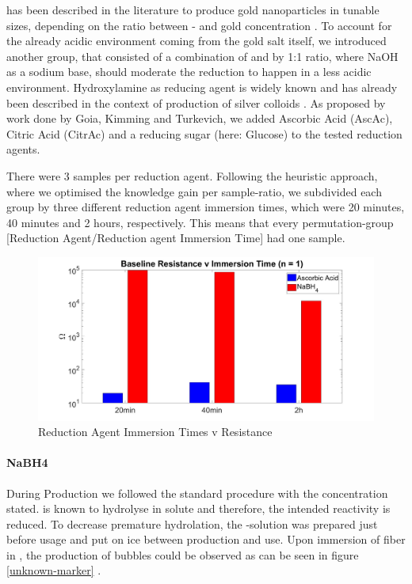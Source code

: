  has been described in the literature to produce gold nanoparticles in tunable sizes, depending on the ratio between - and gold concentration \cite{NaBH4UsedForGoldNP}. To account for the already acidic environment coming from the gold salt itself, we introduced another group, that consisted of a combination of  and  by 1:1 ratio, where NaOH as a sodium base, should moderate the reduction to happen in a less acidic environment.
Hydroxylamine as reducing agent is widely known and has already been described in the context of production of silver colloids \cite{Leopold}.  
As proposed by work done by Goia, Kimming and Turkevich, we added Ascorbic Acid (AscAc), Citric Acid (CitrAc) and a reducing sugar (here: Glucose) to the tested reduction agents. \cite{Goia, Kimling, Frens}

There were 3 samples per reduction agent. Following the heuristic approach, where we optimised the knowledge gain per sample-ratio, we subdivided each group by three different reduction agent immersion times, which were 20 minutes, 40 minutes and 2 hours, respectively. This means that every permutation-group [Reduction Agent/Reduction agent Immersion Time] had one sample.


\begin{figure}[H]
	\centerline{\includegraphics[width=1.2\textwidth]{./pic/tRedVR0.jpg}}
	\caption{Reduction Agent Immersion Times v Resistance}
	\label{fig:R0VtRed}
\end{figure}


\paragraph{NaBH4}
During Production we followed the standard procedure with the concentration stated.  is known to hydrolyse in solute and therefore, the intended reactivity is reduced. To decrease premature hydrolation, the -solution was prepared just before usage and put on ice between production and use. Upon immersion of fiber in , the production of bubbles could be observed as can be seen in figure \ref{unknown-marker} .

